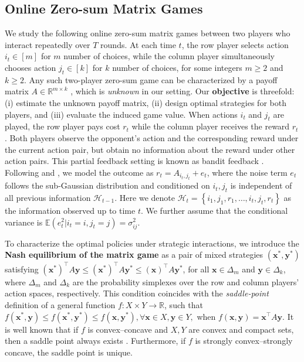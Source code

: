 \documentclass[12pt]{article}
\begin{document}
\subsection{Online Zero-sum Matrix Games} \label{subsec:2.1}
We study the following online zero-sum matrix games between two players who interact repeatedly over $T$ rounds. At each time $t$, the row player selects action $i_t \in [m]$ for $m$ number of choices, while the column player simultaneously chooses action $j_t \in [k]$ for $k$ number of choices, for some integers $m\geq 2$ and $k\geq 2$. Any such two-player zero-sum game can be characterized by a payoff matrix $A \in \mathbb{R}^{m\times k}$ \citep{v1928theorie,neumann2007theory}, which is \textit{unknown} in our setting. 
Our \textbf{objective} is threefold: (i) estimate the unknown payoff matrix, (ii) design optimal strategies for both players, and (iii) evaluate the induced game value. 
When actions $i_t$ and $j_t$ are played, the row player pays cost $r_t$ while the column player receives the reward $r_t$. Both players observe the opponent’s action and the corresponding reward under the current action pair, but obtain no information about the reward under other action pairs. This partial feedback setting is known as bandit feedback \citep{lattimore2020bandit}. Following \cite{o2021matrix} and \cite{li2024optimistic}, we model the outcome as $r_t = A_{i_t,j_t}+e_t$, where the noise term $e_t$ follows the sub-Gaussian distribution and conditioned on $i_t,j_t$ is independent of all previous information $\mathcal{H}_{t-1}$. Here we denote $\mathcal{H}_t = \left\{i_1,j_1,r_1,\dots, i_{t},j_{t},r_{t}\right\}$ as the information observed up to time $t$. We further assume that the conditional variance is $\mathbb{E}(e_t^2\vert i_t=i,j_t=j) = \sigma_{ij}^2$. 


To characterize the optimal policies under strategic interactions, we introduce the \textbf{Nash equilibrium of the matrix game} as a pair of mixed strategies $(\bm{x}^\ast,\bm{y}^\ast)$ satisfying
$(\bm{x}^\ast)^\top A \bm{y} \le (\bm{x}^\ast)^\top A \bm{y}^\ast \le (\bm{x})^\top A \bm{y}^\ast$, 
for all $\bm{x}\in\Delta_m$ and $\bm{y}\in\Delta_k$, where $\Delta_m$ and $\Delta_k$ are the probability simplexes over the row and column players' action spaces, respectively.
This condition coincides with the \textit{saddle-point} definition of a general function $f: X \times Y \to \mathbb{R}$, such that
$f(\bm{x}^\ast, \bm{y}) \le f(\bm{x}^\ast, \bm{y}^\ast) \le f(\bm{x}, \bm{y}^\ast), \forall \bm{x}\in X, \bm{y}\in Y, $ 
when $f(\bm{x}, \bm{y}) = \bm{x}^\top A \bm{y}$. It is well known that if $f$ is convex–concave and $X, Y$ are convex and compact sets, then a saddle point always exists \citep{boyd2004convex}. Furthermore, if $f$ is strongly convex–strongly concave, the saddle point is unique. 
\end{document}
